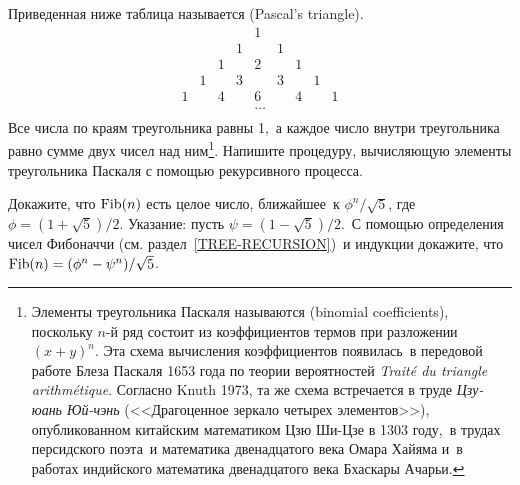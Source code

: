 \begin{exercise}{1.12}\label{EX1.12}%
Приведенная ниже таблица называется 
 (Pascal's triangle).
$$
\begin{array}{ccccccccc}
&&&& 1 \\
&&& 1 && 1 \\
&& 1 && 2 && 1 \\
& 1 && 3 && 3 && 1 \\
1 && 4 && 6 && 4 && 1 \\
&&&& \ldots \\
\end{array}
$$
Все числа по краям треугольника равны 1,~а каждое число внутри
треугольника равно сумме двух чисел над ним\footnote{Элементы треугольника Паскаля называются 
  (binomial
  coefficients),
  поскольку $n$-й ряд состоит из коэффициентов термов при
  разложении $(x + y)^n$. Эта схема вычисления коэффициентов
  появилась~в передовой работе  Блеза Паскаля 
  1653 года по теории вероятностей
  {\em Trait\'e du triangle arithm\'etique}. Согласно 
  Knuth 1973, 
  та же схема встречается в
  труде {\em Цзу-юань Юй-чэнь} (<<Драгоценное зеркало
  четырех элементов>>), опубликованном китайским математиком Цзю
  Ши-Цзе
 в 1303 году,~в трудах персидского поэта~и математика
  двенадцатого века Омара Хайяма
  и~в работах индийского математика
  двенадцатого века Бхаскары Ачарьи.}.
Напишите процедуру, вычисляющую элементы треугольника Паскаля с
помощью рекурсивного процесса.
\end{exercise}
\begin{exercise}{1.13}\label{EX1.13}%
Докажите, что $\mathop{\rm Fib}(n)$ есть целое 
число, ближайшее~к $\phi^n / \sqrt{5}$, где $\phi = 
(1 + \sqrt{5}) / 2$. Указание: пусть $\psi = (1 -
\sqrt{5}) / 2$.~С помощью определения чисел
Фибоначчи (см. раздел~\ref{TREE-RECURSION})~и индукции
докажите, что $\mathop{\rm Fib}(n) = (\phi^n - \psi^n) 
/ \sqrt{5}$.
\end{exercise}

